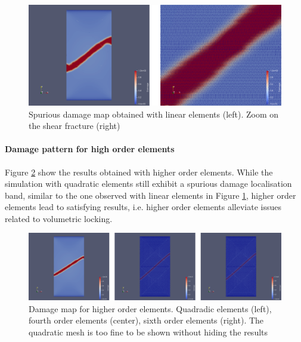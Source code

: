 \begin{figure}[H]
  \centering
  \includegraphics[width=14.cm]{../chapter_003_ef_micromorphic/figures/shear-driven-fracture-damage-results-order-1.pdf}
  \caption{Spurious damage map obtained with linear elements (left). Zoom on the shear fracture (right)}
  \label{fig:micromorphicdamage:shear_driven_fracture_test_order1}
\end{figure}

\paragraph{Damage pattern for high order elements}

Figure \ref{fig:micromorphicdamage:shear_driven_fracture_test_higher_order}
show the results obtained with higher order elements. While the
simulation with quadratic elements still exhibit a spurious damage
localisation band, similar to the one observed with linear elements in
Figure \ref{fig:micromorphicdamage:shear_driven_fracture_test_order1}, higher
order elements lead to satisfying results, i.e. higher order elements
alleviate issues related to volumetric locking.

\begin{figure}[H]
  \centering
  \includegraphics[width=14.cm]{../chapter_003_ef_micromorphic/figures/shear-driven-fracture-damage-results-higher-orders.pdf}
  \caption{Damage map for higher order elements. Quadradic elements (left), fourth order elements (center), sixth order elements (right). The quadratic mesh is too fine to be shown without hiding the results}
  \label{fig:micromorphicdamage:shear_driven_fracture_test_higher_order}
\end{figure}

